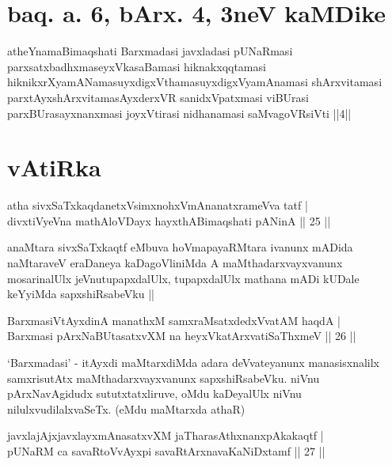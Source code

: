 \section{baq. a. 6, bArx. 4, 3neV kaMDike}

\begin{shl}
atheYnamaBimaqshati Barxmadasi javxladasi pUNaRmasi parxsatxbadhxmaseyxVkasaBamasi hiknakxqqtamasi hiknikxrXyamANamasuyxdigxVthamasuyxdigxVyamAnamasi shArxvitamasi parxtAyxshArxvitamasAyxderxVR sanidxVpatxmasi viBUrasi parxBUrasayxnanxmasi joyxVtirasi nidhanamasi saMvagoVR\s siVti ||4||
\end{shl}

\section*{vAtiRka}

\begin{shl}
atha sivxSaTxkaqdanetxV\s simxnohxVmAnanatxrameVva tatf | \\
divxtiVyeVna mathA\s \s loVDayx hayxthABimaqshati pANinA \hfill|| 25 || 
\end{shl}

\begin{artha}
anaMtara sivxSaTxkaqtf eMbuva hoVmapayaRMtara ivanunx mADida naMtaraveV eraDaneya kaDagoVliniMda A maMthadarxvayxvanunx mosarinalUlx jeVnutupapxdalUlx, tupapxdalUlx mathana mADi kUDale keYyiMda sapxshiRsabeVku ||
\end{artha}


\begin{shl}
BarxmasiVtAyxdinA manathxM samxraMsatxdedxVvatAM haqdA | \\
Barxmasi pArxNaBUtasatxvXM na heyxVkatArxvatiSaThxmeV \hfill|| 26 || 
\end{shl}

\begin{artha}
`Barxmadasi' - itAyxdi maMtarxdiMda adara deVvateyanunx manasisxnalilx samxrisutAtx maMthadarxvayxvanunx sapxshiRsabeVku. niVnu pArxNavAgidudx sututxtatxliruve, oMdu kaDeyalUlx niVnu nilulxvudilalxvaSeTx. (eMdu maMtarxda athaR)
\end{artha}


\begin{shl}
javxlajAjxjavxlayxmAnasatxvXM jaTharasAthxnanxpAkakaqtf | \\
pUNaRM ca savaRtoVvAyxpi savaRtArxnavaKaNiDxtamf \hfill|| 27 || 
\end{shl}


